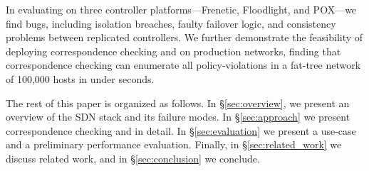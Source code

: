 In evaluating \projectname{} on
three controller platforms---Frenetic, Floodlight, and POX---we find  bugs,
including isolation breaches,
faulty failover logic, and consistency problems between replicated
controllers. We further demonstrate the feasibility of deploying
correspondence checking and \simulator{} on production networks,
finding that correspondence checking can enumerate all policy-violations in a
fat-tree network of 100,000 hosts in under  seconds.

The rest of this paper is organized as follows. In \S\ref{sec:overview},
we present an overview of the SDN stack and its failure modes.
In \S\ref{sec:approach} we present correspondence checking and
\simulator{} in detail. In \S\ref{sec:evaluation} we present
a use-case and a preliminary performance evaluation.
Finally, in \S\ref{sec:related_work} we discuss related work,
and in \S\ref{sec:conclusion} we conclude.

\subsection{}

